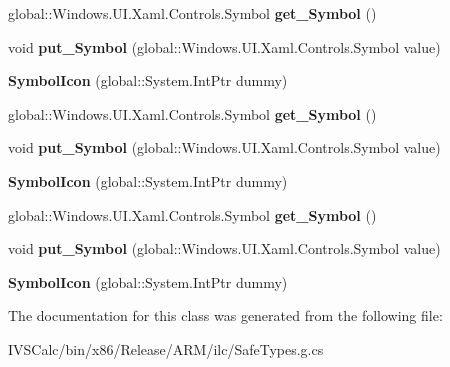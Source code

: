 \begin{DoxyCompactItemize}
global\+::\+Windows.\+U\+I.\+Xaml.\+Controls.\+Symbol {\bfseries get\+\_\+\+Symbol} ()
\item 
\mbox{\label{class_windows_1_1_u_i_1_1_xaml_1_1_controls_1_1_symbol_icon_a4f2423f82a5b8810309632895e157654}} 
void {\bfseries put\+\_\+\+Symbol} (global\+::\+Windows.\+U\+I.\+Xaml.\+Controls.\+Symbol value)
\item 
\mbox{\label{class_windows_1_1_u_i_1_1_xaml_1_1_controls_1_1_symbol_icon_aacfa748103e37307067fb1aee74bda08}} 
{\bfseries Symbol\+Icon} (global\+::\+System.\+Int\+Ptr dummy)
\item 
\mbox{\label{class_windows_1_1_u_i_1_1_xaml_1_1_controls_1_1_symbol_icon_a5bb14b0bce6c93d2995fe916df39828f}} 
global\+::\+Windows.\+U\+I.\+Xaml.\+Controls.\+Symbol {\bfseries get\+\_\+\+Symbol} ()
\item 
\mbox{\label{class_windows_1_1_u_i_1_1_xaml_1_1_controls_1_1_symbol_icon_a4f2423f82a5b8810309632895e157654}} 
void {\bfseries put\+\_\+\+Symbol} (global\+::\+Windows.\+U\+I.\+Xaml.\+Controls.\+Symbol value)
\item 
\mbox{\label{class_windows_1_1_u_i_1_1_xaml_1_1_controls_1_1_symbol_icon_aacfa748103e37307067fb1aee74bda08}} 
{\bfseries Symbol\+Icon} (global\+::\+System.\+Int\+Ptr dummy)
\item 
\mbox{\label{class_windows_1_1_u_i_1_1_xaml_1_1_controls_1_1_symbol_icon_a5bb14b0bce6c93d2995fe916df39828f}} 
global\+::\+Windows.\+U\+I.\+Xaml.\+Controls.\+Symbol {\bfseries get\+\_\+\+Symbol} ()
\item 
\mbox{\label{class_windows_1_1_u_i_1_1_xaml_1_1_controls_1_1_symbol_icon_a4f2423f82a5b8810309632895e157654}} 
void {\bfseries put\+\_\+\+Symbol} (global\+::\+Windows.\+U\+I.\+Xaml.\+Controls.\+Symbol value)
\item 
\mbox{\label{class_windows_1_1_u_i_1_1_xaml_1_1_controls_1_1_symbol_icon_aacfa748103e37307067fb1aee74bda08}} 
{\bfseries Symbol\+Icon} (global\+::\+System.\+Int\+Ptr dummy)
\end{DoxyCompactItemize}


The documentation for this class was generated from the following file\+:\begin{DoxyCompactItemize}
\item 
I\+V\+S\+Calc/bin/x86/\+Release/\+A\+R\+M/ilc/Safe\+Types.\+g.\+cs\end{DoxyCompactItemize}
